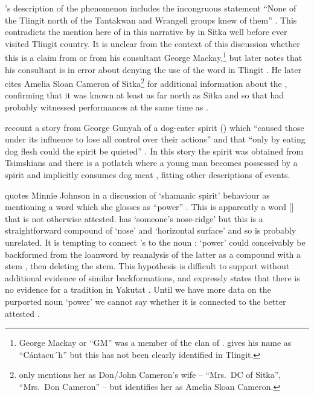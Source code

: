 \citeauthor{olson:1967}’s description of the  phenomenon includes the incongruous statement “None of the Tlingit north of the Tantakwan and Wrangell groups knew of them” \parencite[98]{olson:1967}.
This contradicts the mention here of  in this narrative by  in Sitka well before \citeauthor{olson:1967} ever visited Tlingit country.
It is unclear from the context of this discussion whether this is a claim from \citeauthor{olson:1967} or from his consultant George Mackay,\footnote{George Mackay or “GM” was a member of the  clan of  \parencite[82–83]{olson:1967}.
\citeauthor{olson:1967} gives his name as “Cántacu´h” \parencite[98]{olson:1967} but this has not been clearly identified in Tlingit.} but later \citeauthor{olson:1967} notes that his consultant is in error about denying the use of the word  in Tlingit \parencite[100]{olson:1967}.
He later cites  Amelia Sloan Cameron of Sitka\footnote{\citeauthor{olson:1967} only mentions her as  Don/John Cameron’s wife – “Mrs.\ DC of Sitka”, “Mrs.\ Don Cameron” – but \textcite[130]{jones:2017} identifies her as  Amelia Sloan Cameron.} for additional information about the , confirming that it was known at least as far north as Sitka and so that  had probably witnessed  performances at the same time as .

\citeauthor{garfield-forrest:1948} recount a story from  George Gunyah of a dog-eater spirit () which “caused those under its influence to lose all control over their actions” and that “only by eating dog flesh could the spirit be quieted” \parencite[143]{garfield-forrest:1948}.
In this story the spirit was obtained from Tsimshians and there is a potlatch where a young man becomes possessed by a spirit and implicitly consumes dog meat \parencite[141–145]{garfield-forrest:1948}, fitting other descriptions of  events.

\citeauthor{de-laguna:1972} quotes  Minnie Johnson in a discussion of  ‘shamanic spirit’ behaviour as mentioning a word  which she glosses as “power” \parencite[704 col.\ 1 para.\ 2]{de-laguna:1972}.
This is apparently a word  [] that is not otherwise attested.
\citeauthor{leer:1973} has  ‘someone’s nose-ridge’ \parencite[f06/5]{leer:1973} but this is a straightforward compound of  ‘nose’ and  ‘horizontal surface’ and so is probably unrelated.
It is tempting to connect \citeauthor{de-laguna:1972}’s  to the noun :  ‘power’ could conceivably be backformed from the loanword  by reanalysis of the latter as a compound  with a stem , then deleting the stem.
This hypothesis is difficult to support without additional evidence of similar backformations, and \citeauthor{de-laguna:1972} expressly states that there is no evidence for a  tradition in Yakutat \parencite[628]{de-laguna:1972}.
Until we have more data on the purported noun  ‘power’ we cannot say whether it is connected to the better attested .

